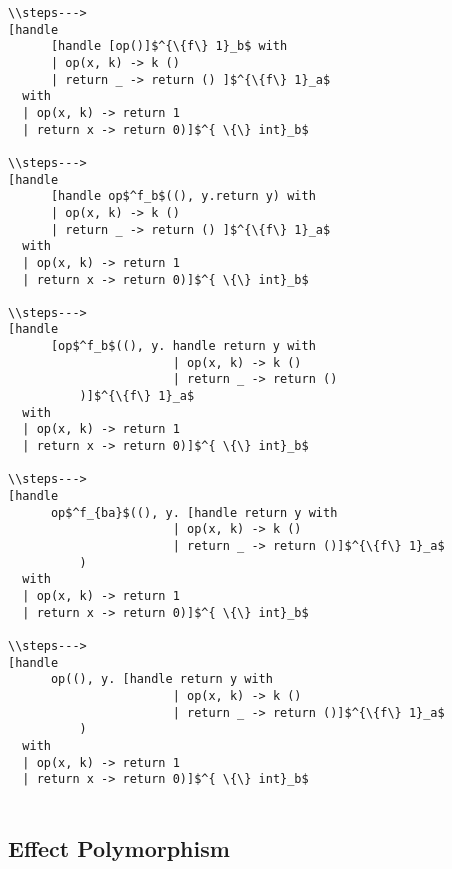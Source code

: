 \documentclass{article}
\theoremstyle{definition}
\begin{document}
\begin{lstlisting}
\\steps--->
[handle 
      [handle [op()]$^{\{f\} 1}_b$ with
      | op(x, k) -> k ()
      | return _ -> return () ]$^{\{f\} 1}_a$ 
  with 
  | op(x, k) -> return 1
  | return x -> return 0)]$^{ \{\} int}_b$
  
\\steps--->
[handle 
      [handle op$^f_b$((), y.return y) with
      | op(x, k) -> k ()
      | return _ -> return () ]$^{\{f\} 1}_a$ 
  with 
  | op(x, k) -> return 1
  | return x -> return 0)]$^{ \{\} int}_b$
  
\\steps--->
[handle 
      [op$^f_b$((), y. handle return y with
                       | op(x, k) -> k ()
                       | return _ -> return () 
          )]$^{\{f\} 1}_a$ 
  with 
  | op(x, k) -> return 1
  | return x -> return 0)]$^{ \{\} int}_b$
  
\\steps--->
[handle 
      op$^f_{ba}$((), y. [handle return y with
                       | op(x, k) -> k ()
                       | return _ -> return ()]$^{\{f\} 1}_a$ 
          )
  with 
  | op(x, k) -> return 1
  | return x -> return 0)]$^{ \{\} int}_b$
  
\\steps--->
[handle 
      op((), y. [handle return y with
                       | op(x, k) -> k ()
                       | return _ -> return ()]$^{\{f\} 1}_a$ 
          )
  with 
  | op(x, k) -> return 1
  | return x -> return 0)]$^{ \{\} int}_b$
  
\end{lstlisting}

\subsection{Effect Polymorphism}
\end{document}
